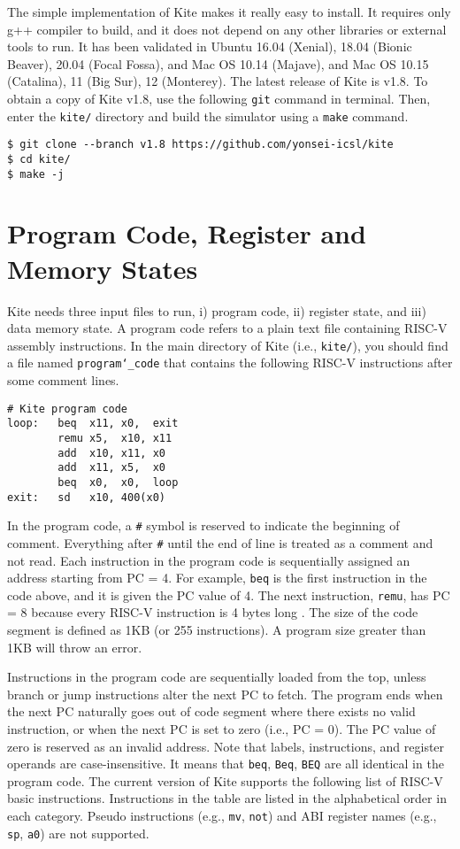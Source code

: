 \documentclass[10pt]{article}
\begin{document}
The simple implementation of Kite makes it really easy to install.
It requires only g++ compiler to build, and it does not depend on any other libraries or external tools to run.
It has been validated in Ubuntu 16.04 (Xenial), 18.04 (Bionic Beaver), 20.04 (Focal Fossa), and Mac OS 10.14 (Majave), and Mac OS 10.15 (Catalina), 11 (Big Sur), 12 (Monterey).
The latest release of Kite is v1.8.
To obtain a copy of Kite v1.8, use the following {\tt git} command in terminal.
Then, enter the {\tt kite/} directory and build the simulator using a {\tt make} command.

\begin{Verbatim}[frame=single,fontsize=\small]
$ git clone --branch v1.8 https://github.com/yonsei-icsl/kite
$ cd kite/
$ make -j
\end{Verbatim}


\section{Program Code, Register and Memory States} \label{sec:inputs}
Kite needs three input files to run, i) program code, ii) register state, and iii) data memory state.
A program code refers to a plain text file containing RISC-V assembly instructions.
In the main directory of Kite (i.e., {\tt kite/}), you should find a file named {\tt program\char`_code} that contains the following RISC-V instructions after some comment lines.
\pagebreak

\begin{Verbatim}[frame=single,fontsize=\small]
# Kite program code
loop:   beq  x11, x0,  exit
        remu x5,  x10, x11
        add  x10, x11, x0
        add  x11, x5,  x0
        beq  x0,  x0,  loop
exit:   sd   x10, 400(x0)
\end{Verbatim}

In the program code, a {\tt \#} symbol is reserved to indicate the beginning of comment.
Everything after {\tt \#} until the end of line is treated as a comment and not read.
Each instruction in the program code is sequentially assigned an address starting from PC = 4.
For example, {\tt beq} is the first instruction in the code above, and it is given the PC value of 4.
The next instruction, {\tt remu}, has PC = 8 because every RISC-V instruction is 4 bytes long \cite{waterman_riscv2019}.
The size of the code segment is defined as 1KB (or 255 instructions).
A program size greater than 1KB will throw an error.

Instructions in the program code are sequentially loaded from the top, unless branch or jump instructions alter the next PC to fetch.
The program ends when the next PC naturally goes out of code segment where there exists no valid instruction, or when the next PC is set to zero (i.e., PC = 0).
The PC value of zero is reserved as an invalid address.
Note that labels, instructions, and register operands are case-insensitive.
It means that {\tt beq}, {\tt Beq}, {\tt BEQ} are all identical in the program code.
The current version of Kite supports the following list of RISC-V basic instructions.
Instructions in the table are listed in the alphabetical order in each category.
Pseudo instructions (e.g., {\tt mv}, {\tt not}) and ABI register names (e.g., {\tt sp}, {\tt a0}) are not supported.
 
\end{document}
